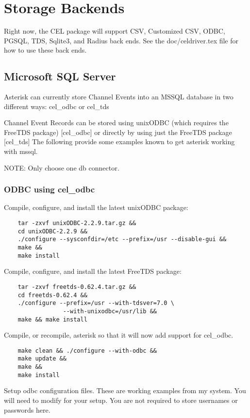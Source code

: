 \section{Storage Backends}

Right now, the CEL package will support CSV, Customized CSV, ODBC, PGSQL, TDS,
Sqlite3, and Radius back ends.  See the doc/celdriver.tex file
for how to use these back ends.

\subsection{Microsoft SQL Server}

	Asterisk can currently store Channel Events into an MSSQL database in
	two different ways:  cel\_odbc or cel\_tds

	Channel Event Records can be stored using unixODBC (which requires
	the FreeTDS package) [cel\_odbc] or directly by using just the
	FreeTDS package [cel\_tds]  The following provide some
	examples known to get asterisk working with mssql.

	NOTE:  Only choose one db connector.

\subsubsection{ODBC using cel\_odbc}
	Compile, configure, and install the latest unixODBC package:
\begin{verbatim}
	tar -zxvf unixODBC-2.2.9.tar.gz &&
	cd unixODBC-2.2.9 &&
	./configure --sysconfdir=/etc --prefix=/usr --disable-gui &&
	make &&
	make install
\end{verbatim}

	Compile, configure, and install the latest FreeTDS package:
\begin{verbatim}
	tar -zxvf freetds-0.62.4.tar.gz &&
	cd freetds-0.62.4 &&
	./configure --prefix=/usr --with-tdsver=7.0 \
                 --with-unixodbc=/usr/lib &&
	make && make install
\end{verbatim}

	Compile, or recompile, asterisk so that it will now add support
	for cel\_odbc.
\begin{verbatim}
	make clean && ./configure --with-odbc &&
	make update &&
	make &&
	make install
\end{verbatim}

	Setup odbc configuration files.  These are working examples
	from my system.  You will need to modify for your setup.
	You are not required to store usernames or passwords here.

